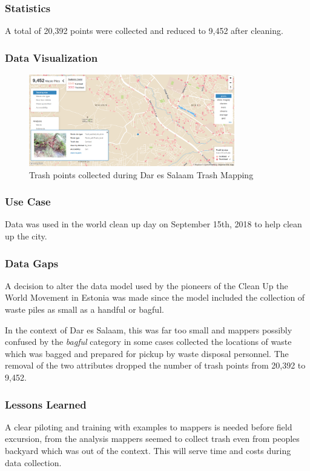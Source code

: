 \documentclass[a4paper,12pt,twoside]{article}
\begin{document}
\subsubsection{Statistics}
A total of 20,392 points were collected and reduced to 9,452 after cleaning.

\subsubsection{Data Visualization}
\begin{figure}[h]
  \color{RHgreen}\caption{Trash points collected during Dar es Salaam Trash Mapping}
  \centering
 \includegraphics[width=0.8\textwidth]{images/dar_trash.png}
\end{figure}

\subsubsection{Use Case}
Data was used in the world clean up day on  September 15th, 2018 to help clean up the city.

\subsubsection{Data Gaps}
A decision to alter the data model used by the pioneers of the Clean Up the World Movement in Estonia was made since the model included the collection of waste piles as small as a handful or bagful.

In the context of Dar es Salaam, this was far too small and mappers possibly confused by the \textit{bagful} category in some cases collected the locations of waste which was bagged and prepared for pickup by waste disposal personnel. The removal of the two attributes dropped the number of trash points from 20,392 to 9,452.

\subsubsection{Lessons Learned}
A clear piloting and training with examples to mappers is needed before field excursion, from the analysis mappers seemed to collect trash even from peoples backyard which was out of the context. This will serve time and costs during data collection.
\end{document}
